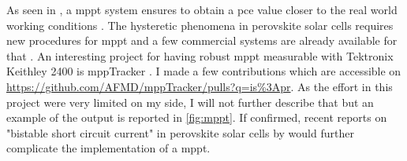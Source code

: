 	As seen in , a \gls{mppt} system ensures to obtain a \gls{pce} value closer to the real world working conditions \cite{Zimmermann2016}.
	The hysteretic phenomena in perovskite solar cells requires new procedures for \gls{mppt} \cite{Cimaroli2017,Pellet2017,Rakocevic2019} and a few commercial systems are already available for that \cite{CicciResearchsrl2019,CandlelightSystems}.
	An interesting project for having robust \gls{mppt} measurable with Tektronix Keithley 2400 is mppTracker \cite{AFMD2017}.
	I made a few contributions which are accessible on \url{https://github.com/AFMD/mppTracker/pulls?q=is%3Apr}.
	As the effort in this project were very limited on my side, I will not further describe that but an example of the output is reported in \cref{fig:mppt}.
	If confirmed, recent reports on "bistable short circuit current" in perovskite solar cells by  would further complicate the implementation of a \gls{mppt}.
	\begin{figure}[H]
	\end{figure}

	


